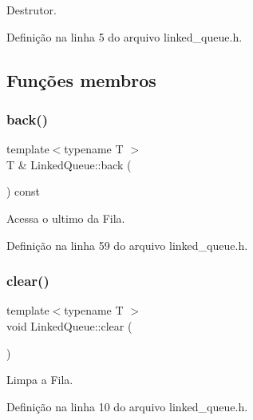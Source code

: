 Destrutor. 



Definição na linha 5 do arquivo linked\+\_\+queue.\+h.



\subsection{Funções membros}
\mbox{\label{classstructures_1_1_linked_queue_a194d5842787ddffafecfb44bd14e8d9d}} 
\subsubsection{\texorpdfstring{back()}{back()}}
{\footnotesize\ttfamily template$<$typename T $>$ \\
T \& Linked\+Queue\+::back (\begin{DoxyParamCaption}{ }\end{DoxyParamCaption}) const}



Acessa o ultimo da Fila. 



Definição na linha 59 do arquivo linked\+\_\+queue.\+h.

\mbox{\label{classstructures_1_1_linked_queue_a7fd13289965085b6224d3c87e9555a1a}} 
\subsubsection{\texorpdfstring{clear()}{clear()}}
{\footnotesize\ttfamily template$<$typename T $>$ \\
void Linked\+Queue\+::clear (\begin{DoxyParamCaption}{ }\end{DoxyParamCaption})}



Limpa a Fila. 



Definição na linha 10 do arquivo linked\+\_\+queue.\+h.

